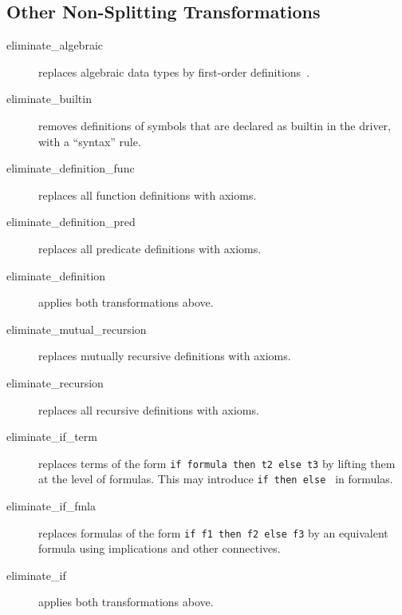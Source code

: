 \subsection{Other Non-Splitting Transformations}

\begin{description}

\item[eliminate\_algebraic] replaces algebraic data types by first-order
definitions~\cite{paskevich09rr}.

\item[eliminate\_builtin] removes definitions of symbols that are
  declared as builtin in the driver, \ie with a ``syntax'' rule.

\item[eliminate\_definition\_func]
  replaces all function definitions with axioms.

\item[eliminate\_definition\_pred]
  replaces all predicate definitions with axioms.

\item[eliminate\_definition]
  applies both transformations above.

\item[eliminate\_mutual\_recursion]
  replaces mutually recursive definitions with axioms.

\item[eliminate\_recursion]
  replaces all recursive definitions with axioms.

\item[eliminate\_if\_term] replaces terms of the form \texttt{if
    formula then t2 else t3} by lifting them at the level of formulas.
  This may introduce \texttt{if then else } in formulas.

\item[eliminate\_if\_fmla] replaces formulas of the form \texttt{if f1 then f2
  else f3} by an equivalent formula using implications and other
  connectives.

\item[eliminate\_if]
  applies both transformations above.


\end{description}

